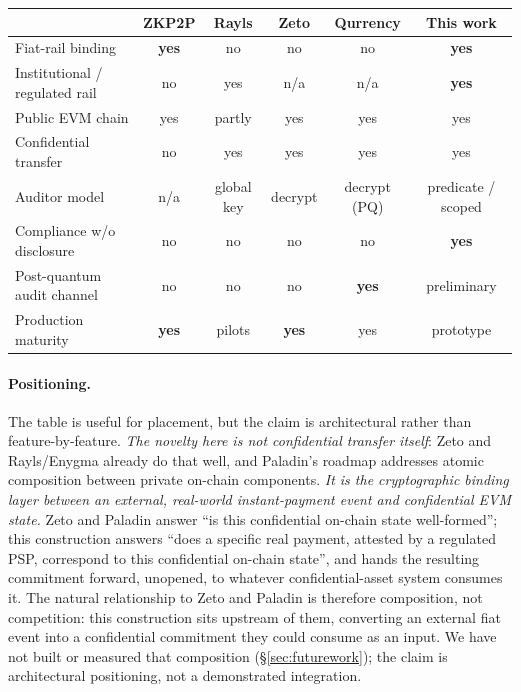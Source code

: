 \documentclass[11pt]{article}
\begin{document}
\begin{center}
\small
\begin{tabular}{@{}lccccc@{}}
\toprule
 & \textbf{ZKP2P} & \textbf{Rayls} & \textbf{Zeto} & \textbf{Qurrency} & \textbf{This work} \\
\midrule
Fiat-rail binding                 & \textbf{yes} & no          & no          & no          & \textbf{yes} \\
Institutional / regulated rail    & no           & yes         & n/a         & n/a         & \textbf{yes} \\
Public EVM chain                  & yes          & partly      & yes         & yes         & yes \\
Confidential transfer             & no           & yes         & yes         & yes         & yes \\
Auditor model                     & n/a          & global key  & decrypt     & decrypt (PQ)& predicate / scoped \\
Compliance w/o disclosure         & no           & no          & no          & no          & \textbf{yes} \\
Post-quantum audit channel        & no           & no          & no          & \textbf{yes}& preliminary \\
Production maturity               & \textbf{yes} & pilots      & \textbf{yes}& yes         & prototype \\
\bottomrule
\end{tabular}
\end{center}

\paragraph{Positioning.} The table is useful for placement, but the claim is
architectural rather than feature-by-feature. \emph{The novelty here is not
confidential transfer itself}: Zeto and Rayls/Enygma already do that well, and
Paladin's roadmap addresses atomic composition between private on-chain
components. \emph{It is the cryptographic binding layer between an
external, real-world instant-payment event and confidential EVM state.} Zeto
and Paladin answer ``is this confidential on-chain state well-formed''; this
construction answers ``does a specific real payment, attested by a regulated
PSP, correspond to this confidential on-chain state'', and hands the resulting
commitment forward, unopened, to whatever confidential-asset system consumes
it. The natural relationship to Zeto and Paladin is therefore composition, not
competition: this construction sits upstream of them, converting an external
fiat event into a confidential commitment they could consume as an input. We
have not built or measured that composition (\S\ref{sec:futurework}); the claim
is architectural positioning, not a demonstrated integration.
\end{document}
